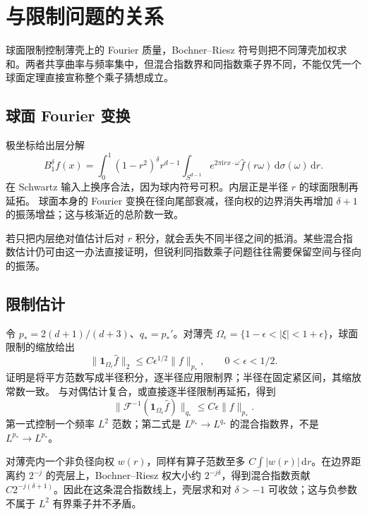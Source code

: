 \section{与限制问题的关系}
\label{b2:sec:2404}

球面限制控制薄壳上的 Fourier 质量，Bochner–Riesz 符号则把不同薄壳加权求和。两者共享曲率与频率集中，但混合指数界和同指数乘子界不同，不能仅凭一个球面定理直接宣称整个乘子猜想成立。

\subsection{球面 Fourier 变换}
\label{b2:subsec:240401}

极坐标给出层分解
\[
 B_1^\delta f(x)=\int_0^1(1-r^2)^\delta r^{d-1}
        \int_{S^{d-1}}e^{2\pi\mathrm i r x\cdot\omega}
                  \widehat f(r\omega)\,\mathrm d\sigma(\omega)\,\mathrm dr.
\]
在 Schwartz 输入上换序合法，因为球内符号可积。内层正是半径 \(r\) 的球面限制再延拓。
球面本身的 Fourier 变换在径向尾部衰减，径向权的边界消失再增加 \(\delta+1\) 的振荡增益；这与核渐近的总阶数一致。

\ProseParagraphBreak
若只把内层绝对值估计后对 \(r\) 积分，就会丢失不同半径之间的抵消。某些混合指数估计仍可由这一办法直接证明，但锐利同指数乘子问题往往需要保留空间与径向的振荡。

\subsection{限制估计}
\label{b2:subsec:240402}

令 \(p_*=2(d+1)/(d+3)\)、\(q_*=p_*'\)。对薄壳
\(\Omega_\epsilon=\{1-\epsilon<|\xi|<1+\epsilon\}\)，球面限制的缩放给出
\[
 \|\mathbf1_{\Omega_\epsilon}\widehat f\|_2
       \le C\epsilon^{1/2}\|f\|_{p_*},\qquad0<\epsilon<1/2.
\]
证明是将平方范数写成半径积分，逐半径应用限制界；半径在固定紧区间，其缩放常数一致。
与对偶估计复合，或直接逐半径限制再延拓，得到
\[
 \|\mathcal F^{-1}(\mathbf1_{\Omega_\epsilon}\widehat f)\|_{q_*}
       \le C\epsilon\|f\|_{p_*}.
\]
第一式控制一个频率 \(L^2\) 范数；第二式是 \(L^{p_*}\to L^{q_*}\) 的混合指数界，不是 \(L^{p_*}\to L^{p_*}\)。

\ProseParagraphBreak
对薄壳内一个非负径向权 \(w(r)\)，同样有算子范数至多
\(C\int|w(r)|\,\mathrm dr\)。在边界距离约 \(2^{-j}\) 的壳层上，Bochner–Riesz 权大小约 \(2^{-j\delta}\)，得到混合指数贡献 \(C2^{-j(\delta+1)}\)。因此在这条混合指数线上，壳层求和对 \(\delta>-1\) 可收敛；这与负参数不属于 \(L^2\) 有界乘子并不矛盾。

